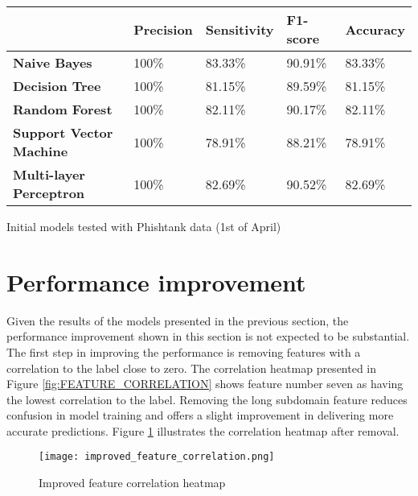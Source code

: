\begin{singlespace}
	\begin{center}
		\label{tab:FIRST_TRAINED_MODELS}
		\begin{tabular}{ | m{13em} | m{5em} | m{5em} | m{5em} | m{5em} | }
			\hline
			                                & \textbf{Precision} & \textbf{Sensitivity} & \textbf{F1-score} & \textbf{Accuracy} \\
			\hline
			\textbf{Naive Bayes}            & 100\%              & 83.33\%              & 90.91\%           & 83.33\%           \\
			\hline
			\textbf{Decision Tree}          & 100\%              & 81.15\%              & 89.59\%           & 81.15\%           \\
			\hline
			\textbf{Random Forest}          & 100\%              & 82.11\%              & 90.17\%           & 82.11\%           \\
			\hline
			\textbf{Support Vector Machine} & 100\%              & 78.91\%              & 88.21\%           & 78.91\%           \\
			\hline
			\textbf{Multi-layer Perceptron} & 100\%              & 82.69\%              & 90.52\%           & 82.69\%           \\
			\hline
		\end{tabular}
		\captionsetup{type=table}\caption{Initial models tested with Phishtank data (1st of April)}
	\end{center}
\end{singlespace}


\section{Performance improvement}
Given the results of the models presented in the previous section, the performance improvement shown in this section is not expected to be substantial.
The first step in improving the performance is removing features with a correlation to the label close to zero. The correlation heatmap presented in Figure \ref{fig:FEATURE_CORRELATION} shows feature number seven as having the lowest correlation to the label. Removing the long subdomain feature reduces confusion in model training and offers a slight improvement in delivering more accurate predictions. Figure \ref{fig:IMPROVED_FEATURE_CORRELATION} illustrates the correlation heatmap after removal.

\begin{figure}[t]
	\centering
	\texttt{[image: improved\_feature\_correlation.png]}
	\caption{Improved feature correlation heatmap}
	\label{fig:IMPROVED_FEATURE_CORRELATION}
\end{figure}

